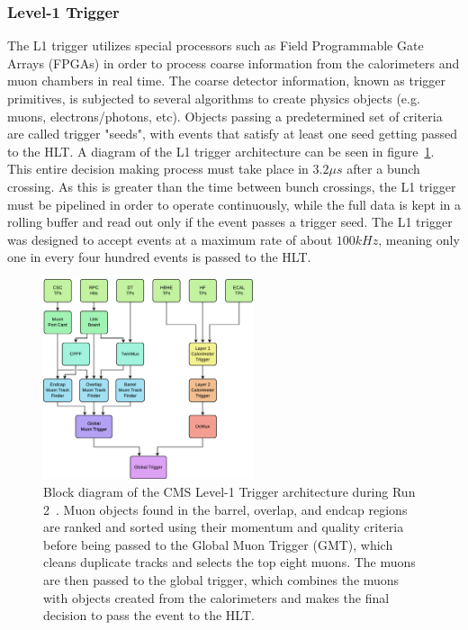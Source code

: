 \subsubsection{Level-1 Trigger} \label{sec:CMS_L1T}
The L1 trigger utilizes special processors such as Field Programmable Gate Arrays (FPGAs) in order to process coarse information from the calorimeters and muon chambers in real time. The coarse detector information, known as trigger primitives, is subjected to several algorithms to create physics objects (e.g. muons, electrons/photons, etc). Objects passing a predetermined set of criteria are called trigger "seeds", with events that satisfy at least one seed getting passed to the HLT. A diagram of the L1 trigger architecture can be seen in figure~\ref{fig:L1T}. This entire decision making process must take place in $3.2\unit{\mu s}$ after a bunch crossing. As this is greater than the time between bunch crossings, the L1 trigger must be pipelined in order to operate continuously, while the full data is kept in a rolling buffer and read out only if the event passes a trigger seed. The L1 trigger was designed to accept events at a maximum rate of about $100\unit{kHz}$, meaning only one in every four hundred events is passed to the HLT.

\begin{figure}[htpb]
	\centering
	\includegraphics[width=0.55\textwidth]{figs/03_experiment/cms_l1t.png}
	\caption[CMS Level-1 Trigger architecture during Run 2~\cite{Sirunyan:2721198}]
	{Block diagram of the CMS Level-1 Trigger architecture during Run 2~\cite{Sirunyan:2721198}. Muon objects found in the barrel, overlap, and endcap regions are ranked and sorted using their momentum and quality criteria before being passed to the Global Muon Trigger (GMT), which cleans duplicate tracks and selects the top eight muons. The muons are then passed to the global trigger, which combines the muons with objects created from the calorimeters and makes the final decision to pass the event to the HLT.}
	\label{fig:L1T}
\end{figure}


